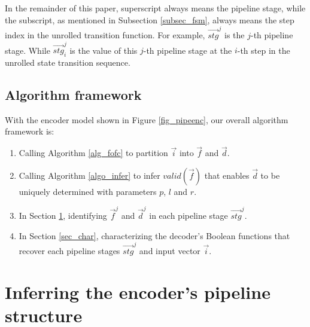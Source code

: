\documentclass[conference]{IEEEtran}
\begin{document}
In the remainder of this paper,
superscript always means the pipeline stage,
while the subscript,
as mentioned in Subsection \ref{subsec_fsm},
always means the step index in the unrolled transition function.
For example,
$\vec{stg}^j$ is the $j$-th pipeline stage.
While $\vec{stg}^j_i$ is the value of this $j$-th pipeline stage 
at the $i$-th step in the unrolled state transition sequence.

\subsection{Algorithm framework}

With the encoder model shown in Figure \ref{fig_pipeenc},
our overall algorithm framework is:

\begin{enumerate}
 \item Calling Algorithm \ref{alg_fofc} to partition $\vec{i}$ into $\vec{f}$ and $\vec{d}$.
 \item Calling Algorithm \ref{algo_infer} to infer $valid(\vec{f})$ that enables $\vec{d}$ 
 to be uniquely determined with parameters $p$, $l$ and $r$.
 \item In Section \ref{sec_pipeinfer}, 
 identifying $\vec{f}^j$ and $\vec{d}^j$ in each pipeline stage $\vec{stg}^j$. 
 \item In Section \ref{sec_char}, 
 characterizing the decoder's Boolean functions that recover each pipeline stages $\vec{stg}^j$
 and input vector $\vec{i}$.
\end{enumerate}



\section{Inferring the encoder's pipeline structure}\label{sec_pipeinfer}

\end{document}
